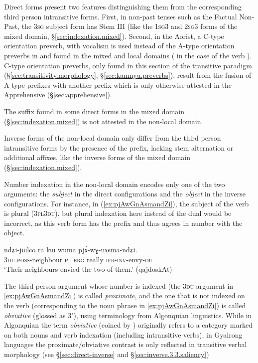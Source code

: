 Direct forms present two features distinguishing them from the corresponding third person intransitive forms. First, in non-past tenses such as the Factual Non-Past, the \textsc{3sg} subject form has Stem III (like the \textsc{1sg}\fl{}3 and \textsc{2sg}\fl{}3 forms of the mixed domain, §\ref{sec:indexation.mixed}). Second, in the Aorist, a C-type orientation preverb, with  vocalism is used instead of the A-type orientation preverbs in  and  found in the mixed and local domains ( in the case of the verb ). C-type orientation preverbs, only found in this section of the transitive paradigm (§\ref{sec:transitivity.morphology}, §\ref{sec:kamnyu.preverbs}), result from the fusion of A-type prefixes with another prefix which is only otherwise attested in the Apprehensive (§\ref{sec:apprehensive}). 

The  suffix found in some direct forms in the mixed domain (§\ref{sec:indexation.mixed}) is not attested in the non-local domain.

Inverse forms of the non-local domain only differ from the third person intransitive forms by the presence of the  prefix, lacking stem alternation or additional affixes, like the inverse forms of the mixed domain (§\ref{sec:indexation.mixed}).

Number indexation in the non-local domain encodes only one of the two arguments: the \textit{subject} in the direct configurations and the \textit{object} in the inverse configurations. For instance, in (\ref{ex:pjAwGnAsmandZi}), the subject of the verb  is plural (\textsc{3pl}\fl{}\textsc{3du}), but plural indexation  here instead of the dual would be incorrect, as this verb form has the  prefix and thus agrees in number with the object.

\begin{exe}
\ex   \label{ex:pjAwGnAsmandZi}
\gll ndʑi-jɯlco ra kɯ wuma pjɤ́-wɣ-nɤsma-ndʑi. \\
\textsc{3du}.\textsc{poss}-neighbour \textsc{pl} \textsc{erg} really \textsc{ifr}-\textsc{inv}-envy-\textsc{du} \\
\glt `Their neighbours envied the two of them.' (qajdoskAt)
\end{exe}

The third person argument whose number is indexed (the \textsc{3du} argument in \ref{ex:pjAwGnAsmandZi}) is called \textit{proximate}, and the one that is not indexed on the verb (corresponding to the noun phrase  in \ref{ex:pjAwGnAsmandZi}) is called \textit{obviative} (glossed as 3$'$), using terminology from Algonquian linguistics. While in Algonquian the term \textit{obviative} (coined by \citealt{cuoq1866}) originally refers to a category marked on both nouns and verb indexation (including intransitive verbs), in Gyalrong languages the proximate/obviative contrast is only reflected in transitive verbal morphology (see §\ref{sec:direct-inverse} and §\ref{sec:inverse.3.3.saliency})


